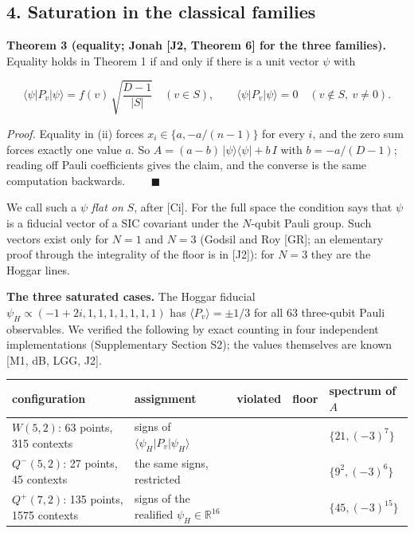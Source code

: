 \documentclass[11pt,a4paper]{article}
\begin{document}
\subsection{4. Saturation in the classical families}\label{4-saturation-in-the-classical-families}

\textbf{Theorem 3 (equality; Jonah {[}J2, Theorem 6{]} for the three families).} Equality holds in Theorem 1 if
and only if there is a unit vector \(\psi\) with

\[\langle \psi | P_v | \psi \rangle = f(v)\,\sqrt{\frac{D-1}{|S|}} \quad (v \in S), \qquad
\langle \psi | P_v | \psi \rangle = 0 \quad (v \notin S,\ v \ne 0).\]

\emph{Proof.} Equality in (ii) forces \(x_i \in \{a, -a/(n-1)\}\) for every \(i\), and the zero sum forces exactly
one value \(a\). So \(A = (a-b)\,|\psi\rangle\langle\psi| + b\,I\) with \(b = -a/(D-1)\); reading off Pauli
coefficients gives the claim, and the converse is the same computation backwards. \(\qquad\blacksquare\)

We call such a \(\psi\) \emph{flat on} \(S\), after {[}Ci{]}. For the full space the condition says that \(\psi\) is a
fiducial vector of a SIC covariant under the \(N\)-qubit Pauli group. Such vectors exist only for \(N = 1\)
and \(N = 3\) (Godsil and Roy {[}GR{]}; an elementary proof through the integrality of the floor is in {[}J2{]}):
for \(N = 3\) they are the Hoggar lines.

\textbf{The three saturated cases.} The Hoggar fiducial \(\psi_H \propto (-1+2i, 1, 1, 1, 1, 1, 1, 1)\) has
\(\langle P_v \rangle = \pm 1/3\) for all 63 three-qubit Pauli observables. We verified the following by
exact counting in four independent implementations (Supplementary Section S2); the values themselves are known
{[}M1, dB, LGG, J2{]}.

{\def\LTcaptype{none} %
{\small
\begin{longtable}[]{@{}>{\raggedright\arraybackslash}p{}>{\raggedright\arraybackslash}p{}>{\raggedright\arraybackslash}p{}>{\raggedright\arraybackslash}p{}>{\raggedright\arraybackslash}p{}@{}}
\toprule\noalign{}
configuration & assignment & violated & floor & spectrum of \(A\) \\
\midrule\noalign{}
\endhead
\bottomrule\noalign{}
\endlastfoot
\(W(5,2)\): 63 points, 315 contexts & signs of \(\langle\psi_H\vert P_v\vert \psi_H\rangle\) & 63 & 63 & \(\{21, (-3)^7\}\) \\
\(Q^-(5,2)\): 27 points, 45 contexts & the same signs, restricted & 9 & 9 & \(\{9^2, (-3)^6\}\) \\
\(Q^+(7,2)\): 135 points, 1575 contexts & signs of the realified \(\psi_H \in \mathbb{R}^{16}\) & 315 & 315 & \(\{45, (-3)^{15}\}\) \\
\end{longtable}
}
}
\end{document}
